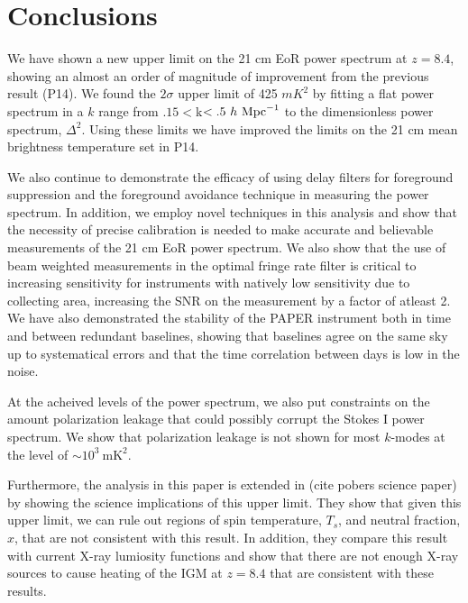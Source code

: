 \documentclass[twocolumn,numberedappendix]{emulateapj} \shorttitle{PSA64}
\begin{document}



\section{Conclusions}\label{sec:conclusion}
We have shown a new upper limit on the 21 cm EoR power spectrum at $z=8.4$,
showing an almost an order of magnitude of improvement from the previous result (P14).
We found the $2\sigma$ upper limit of 425 $mK^{2}$ by fitting a
flat power spectrum in a $k$ range from $.15<$k$<.5\ h\ {\rm Mpc}^{-1}$ to the
dimensionless power spectrum, $\Delta^{2}$. Using these limits we have improved
the limits on the 21 cm mean brightness temperature set in P14.

We also continue to demonstrate the efficacy of using delay filters for
foreground suppression and the foreground avoidance technique in measuring the power
spectrum. In addition, we employ novel techniques in this analysis and show that
the necessity of precise calibration is needed to make accurate and believable
measurements of the 21 cm EoR power spectrum. We also show that the use of beam
weighted measurements in the optimal fringe rate filter is critical to
increasing sensitivity for instruments with natively low sensitivity due to
collecting area, increasing the SNR on the measurement by a factor of atleast 2.
We have also demonstrated the stability of the PAPER instrument both in time and
between redundant baselines, showing that baselines agree on the same sky up to
systematical errors and that the time correlation between days is low in the
noise.

At the acheived levels of the power spectrum, we also put constraints on the
amount polarization leakage that could possibly corrupt the Stokes I power
spectrum. We show that polarization leakage is not shown for most $k$-modes at
the level of $\sim10^{3}\ \text{mK}^{2}$. 

Furthermore, the analysis in this paper is extended in (cite pobers science
paper) by showing the science implications of this upper limit. They show that
given this upper limit, we can rule out regions of spin temperature, $T_{s}$,
and neutral fraction, $x$, that are not consistent with this result. In
addition, they compare this result with current X-ray lumiosity functions and
show that there are not enough X-ray sources to cause heating of the IGM at
$z=8.4$ that are consistent with these results.
\end{document}
